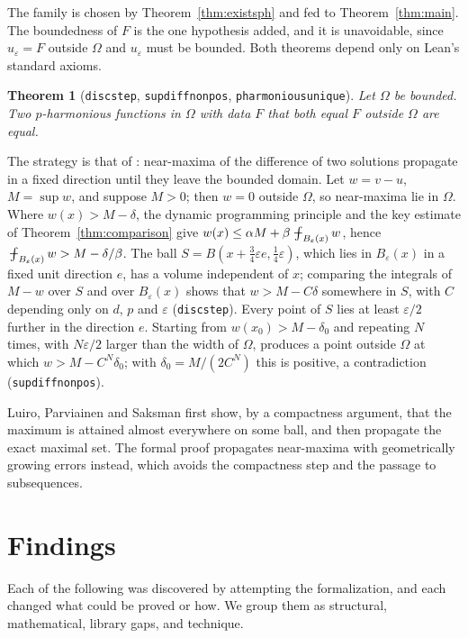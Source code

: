 \documentclass[11pt,reqno]{amsart}
\newcommand{\fint}{\mathop{\mathrlap{\,\rule[0.62ex]{0.62em}{0.5pt}}\int}}
\newcommand{\LEANREF}[1]{\texttt{\small\def\_{\textunderscore\allowbreak}#1}}
\newcommand{\eps}{\varepsilon}
\newcommand{\avgint}{\fint}
\theoremstyle{plain}
\newtheorem{theorem}{Theorem}[section]
\theoremstyle{definition}
\begin{document}
The family is chosen by Theorem~\ref{thm:existsph} and fed to
Theorem~\ref{thm:main}. The boundedness of $F$ is the one hypothesis added, and
it is unavoidable, since $u_\eps = F$ outside $\Omega$ and $u_\eps$ must be
bounded. Both theorems depend only on Lean's standard axioms.

\begin{theorem}[\LEANREF{disc\_step}, \LEANREF{sup\_diff\_nonpos},
\LEANREF{pharmonious\_unique}]\label{thm:discunique}
Let $\Omega$ be bounded. Two $p$-harmonious functions in $\Omega$ with data
$F$ that both equal $F$ outside $\Omega$ are equal.
\end{theorem}

The strategy is that of \cite[Theorem~2.2]{LPS14}: near-maxima of the
difference of two solutions propagate in a fixed direction until they leave the
bounded domain. Let $w = v - u$, $M = \sup w$, and suppose $M > 0$; then
$w = 0$ outside $\Omega$, so near-maxima lie in $\Omega$. Where
$w(x) > M - \delta$, the dynamic programming principle and the key estimate of
Theorem~\ref{thm:comparison} give
$w(x) \le \alpha M + \beta \avgint_{B_\eps(x)} w$, hence
$\avgint_{B_\eps(x)} w > M - \delta/\beta$. The ball
$S = B(x + \frac34\eps e, \frac14\eps)$, which lies in $B_\eps(x)$ in a fixed
unit direction $e$, has a volume independent of $x$; comparing the integrals of
$M - w$ over $S$ and over $B_\eps(x)$ shows that $w > M - C\delta$ somewhere in
$S$, with $C$ depending only on $d$, $p$ and $\eps$ (\LEANREF{disc\_step}).
Every point of $S$ lies at least $\eps/2$ further in the direction $e$. Starting
from $w(x_0) > M - \delta_0$ and repeating $N$ times, with $N\eps/2$ larger
than the width of $\Omega$, produces a point outside $\Omega$ at which
$w > M - C^N\delta_0$; with $\delta_0 = M/(2C^N)$ this is positive, a
contradiction (\LEANREF{sup\_diff\_nonpos}).

Luiro, Parviainen and Saksman first show, by a compactness argument, that the
maximum is attained almost everywhere on some ball, and then propagate the
exact maximal set. The formal proof propagates near-maxima with geometrically
growing errors instead, which avoids the compactness step and the passage to
subsequences.

\section{Findings}\label{sec:findings}

Each of the following was discovered by attempting the formalization, and each
changed what could be proved or how. We group them as structural, mathematical,
library gaps, and technique.
\end{document}
